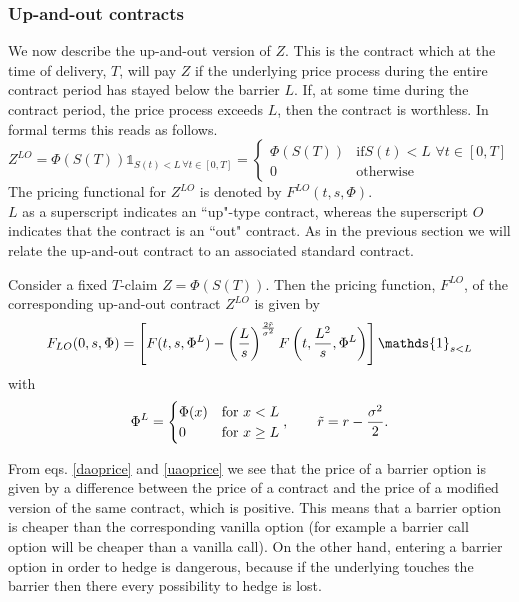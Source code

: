 \subsubsection{Up-and-out contracts}
We now describe the up-and-out version of $Z$. This is the contract which at the time of delivery, $T$, will pay $Z$ if the underlying price process during the entire contract period has stayed below the barrier $L$. If, at some time during the contract period, the price process exceeds $L$, then the contract is worthless. In formal terms this reads as follows.
\begin{equation}
    Z^{LO} = \Phi(S(T))\mathds{1}_{S(t)<L\,\forall t\in[0,T]} =
    \begin{cases}
    \Phi(S(T)) & \text{if} S(t)<L\,\,\forall t\in[0,T] \\
    0 & \text{otherwise}
    \end{cases}
\end{equation}
The pricing functional for $Z^{LO}$ is denoted by $F^{LO}(t,s,\Phi)$.\\
$L$ as a superscript indicates an ``up"-type contract, whereas the superscript $O$ indicates that the contract is an ``out" contract. As in the previous section we will relate the up-and-out contract to an associated standard contract. 
\begin{theorem}
    Consider a fixed $T$-claim $Z = \Phi(S(T))$. Then the pricing function, $F^{LO}$, of the corresponding up-and-out contract $Z^{LO}$ is given by
    \begin{equation}\label{uaoprice}
        F_{LO}(0,s,\Phi) =
        \left[F(t,s,\Phi^L) - \left(\dfrac{L}{s}\right)^{\frac{2\Tilde{r}}{\sigma^2}}F\left(t,\frac{L^2}{s},\Phi^L\right)\right]\mathds{1}_{s<L}
    \end{equation}
    with 
    \begin{equation}
        \Phi^L = 
        \begin{cases}
        \Phi(x) & \text{for }x<L \\
        0 & \text{for }x\ge L
        \end{cases}, 
        \qquad \Tilde{r} = r - \frac{\sigma^2}{2}.
    \end{equation}
\end{theorem}
\begin{remark}
    From eqs. \eqref{daoprice} and \eqref{uaoprice} we see that the price of a barrier option is given by a difference between the price of a contract and the price of a modified version of the same contract, which is positive. This means that a barrier option is cheaper than the corresponding vanilla option (for example a barrier call option will be cheaper than a vanilla call). On the other hand, entering a barrier option in order to hedge is dangerous, because if the underlying touches the barrier then there every possibility to hedge is lost.  
\end{remark}

